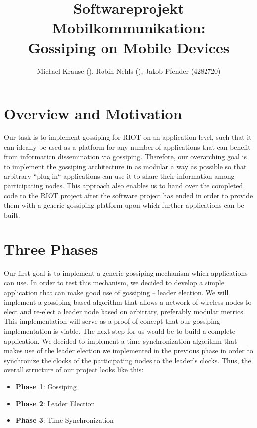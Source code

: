 \documentclass[11pt,
  a4paper,
  ngerman,
  BCOR=7mm
]{scrartcl}
\author{Michael Krause (), Robin Nehls (), Jakob Pfender (4282720)}
\title{Softwareprojekt Mobilkommunikation:\\Gossiping on Mobile
Devices}
\begin{document}
\maketitle

\newpage

\section*{Overview and Motivation}
\label{sec:overview_motivation}
Our task is to implement gossiping for RIOT on an application level,
such that it can ideally be used as a platform for any number of
applications that can benefit from information dissemination via
gossiping. Therefore, our overarching goal is to implement the gossiping
architecture in as modular a way as possible so that arbitrary
``plug-in`` applications can use it to share their information among
participating nodes. This approach also enables us to hand over the
completed code to the RIOT project after the software project has ended
in order to provide them with a generic gossiping platform upon which
further applications can be built.

\section*{Three Phases}
\label{sec:three_phases}
Our first goal is to implement a generic gossiping mechanism which
applications can use. In order to test this mechanism, we decided to
develop a simple application that can make good use of gossiping --
leader election. We will implement a gossiping-based algorithm that
allows a network of wireless nodes to elect and re-elect a leader node
based on arbitrary, preferably modular metrics. This implementation will
serve as a proof-of-concept that our gossiping implementation is viable.
The next step for us would be to build a complete application. We
decided to implement a time synchronization algorithm that makes use of
the leader election we implemented in the previous phase in order to
synchronize the clocks of the participating nodes to the leader's
clocks. Thus, the overall structure of our project looks like this:

\begin{itemize}
  \item \textbf{Phase 1}: Gossiping
  \item \textbf{Phase 2}: Leader Election
  \item \textbf{Phase 3}: Time Synchronization
\end{itemize}
\end{document}
